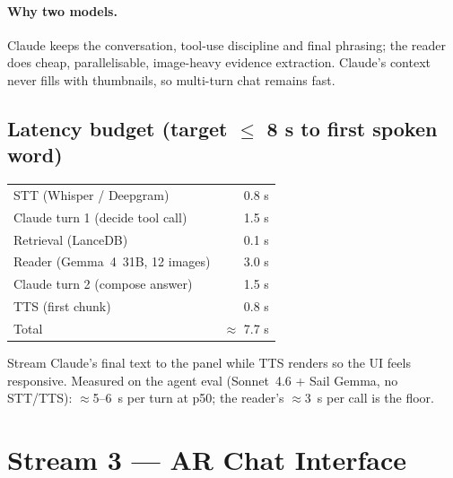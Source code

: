 \documentclass[11pt,a4paper]{article}
\begin{document}
\paragraph{Why two models.} Claude keeps the conversation, tool-use discipline and final phrasing; the reader does cheap, parallelisable, image-heavy evidence extraction. Claude's context never fills with thumbnails, so multi-turn chat remains fast.

\subsection{Latency budget (target $\leq$ 8 s to first spoken word)}
\begin{center}
\begin{tabular}{lr}
\toprule
STT (Whisper / Deepgram) & 0.8 s \\
Claude turn 1 (decide tool call) & 1.5 s \\
Retrieval (LanceDB) & 0.1 s \\
Reader (Gemma~4~31B, 12 images) & 3.0 s \\
Claude turn 2 (compose answer) & 1.5 s \\
TTS (first chunk) & 0.8 s \\
\midrule
Total & $\approx$ 7.7 s \\
\bottomrule
\end{tabular}
\end{center}
Stream Claude's final text to the panel while TTS renders so the UI feels responsive. Measured on the agent eval (Sonnet~4.6 + Sail Gemma, no STT/TTS): $\approx$5--6~s per turn at p50; the reader's $\approx$3~s per call is the floor.

\section{Stream 3 --- AR Chat Interface}
\end{document}
